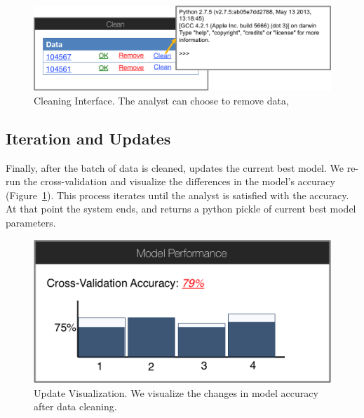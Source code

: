 \begin{figure}[t]
\centering
 \includegraphics[width=\columnwidth]{figs/interface4.png}
 \caption{Cleaning Interface. The analyst can choose to remove data, }
\end{figure}

\subsection{Iteration and Updates}
Finally, after the batch of data is cleaned, \sys updates the current best model.
We re-run the cross-validation and visualize the differences in the model's accuracy (Figure~\ref{modelacc}).
This process iterates until the analyst is satisfied with the accuracy.
At that point the system ends, and returns a python pickle of current best model parameters.

\begin{figure}[t]
\centering
 \includegraphics[width=0.6\columnwidth]{figs/interface5.png}
 \caption{Update Visualization. We visualize the changes in model accuracy after data cleaning.}\label{modelacc}
\end{figure}